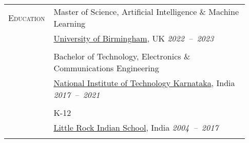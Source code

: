 \documentclass[letterpaper, 10pt, oneside]{article}
\newcommand{\stitle}[1]{\normalsize{\textsc{#1}}}
\begin{document}
\begin{longtable}{@{} p{0.13\linewidth} p{0.8\linewidth}}
  \stitle{Education}                                       & {Master of Science, Artificial Intelligence \& Machine Learning}                                                                                                                                      \\
                                                           & \href{https://birmingham.ac.uk}{University of Birmingham}, UK \hfill \textsl{2022\ --\ 2023}                                                                                                          \\
  \\[-1.5ex]
                                                           & {Bachelor of Technology, Electronics \& Communications Engineering} \hfill                                                                                                                            \\
                                                           & \href{https://nitk.ac.in}{National Institute of Technology Karnataka}, India \hfill \hspace{-3em} \textsl{2017\ --\ 2021}                                                                             \\
  \\[-1.5ex]
                                                           & {K-12}                                                                                                                                                                                                \\
                                                           & \href{https://littlerock.edu.in}{Little Rock Indian School}, India \hfill \textsl{2004\ --\ 2017}                                                                                                     \\
  \\



\end{longtable}
\end{document}

